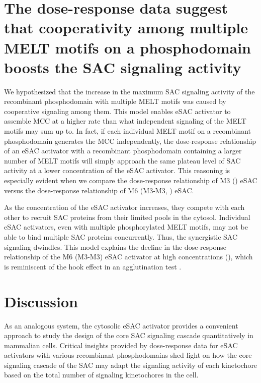\section{The dose-response data suggest that cooperativity among multiple MELT motifs on a  phosphodomain boosts the SAC signaling activity}
\label{ProzoneEffectModel}

We hypothesized that the increase in the maximum SAC signaling activity of the recombinant  phosphodomain with multiple MELT motifs was caused by cooperative signaling among them. This model enables eSAC activator to assemble MCC at a higher rate than what independent signaling of the MELT motifs may sum up to. In fact, if each individual MELT motif on a recombinant  phosphodomain generates the MCC independently, the dose-response relationship of an eSAC activator with a recombinant phosphodomain containing a larger number of MELT motifs will simply approach the same plateau level of SAC activity at a lower concentration of the eSAC activator. This reasoning is especially evident when we compare the dose-response relationship of M3 () eSAC versus the dose-response relationship of M6 (M3-M3, ) eSAC.

As the concentration of the eSAC activator increases, they compete with each other to recruit SAC proteins from their limited pools in the cytosol. Individual eSAC activators, even with multiple phosphorylated MELT motifs, may not be able to bind multiple SAC proteins concurrently. Thus, the synergistic SAC signaling dwindles. This model explains the decline in the dose-response relationship of the M6 (M3-M3) eSAC activator at high concentrations (), which is reminiscent of the hook effect in an agglutination test \cite{HenryV24}.

\section{Discussion}
\label{eSACDiscussions}

As an analogous system, the cytosolic eSAC activator provides a convenient approach to study the design of the core SAC signaling cascade quantitatively in mammalian cells. Critical insights provided by dose-response data for eSAC activators with various recombinant phosphodomains shed light on how the core signaling cascade of the SAC may adapt the signaling activity of each kinetochore based on the total number of signaling kinetochores in the cell.

